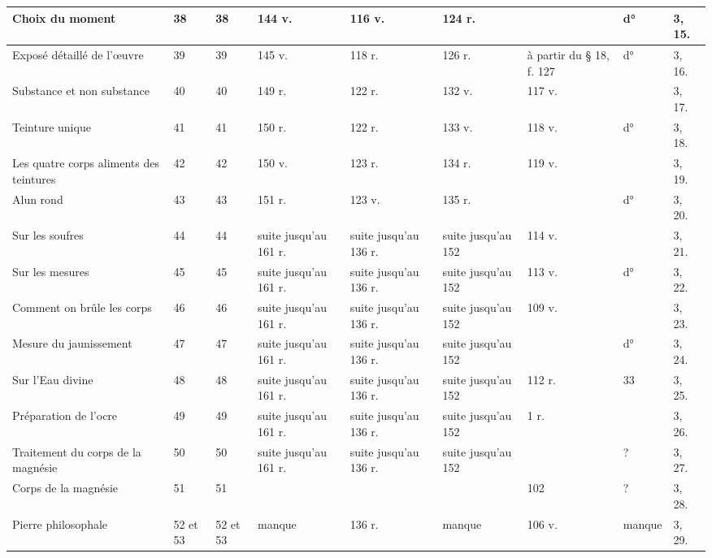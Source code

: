 \documentclass[a4paper, 11pt, oneside, polutonikogreek, french]{article}
\begin{document}
\begin{landscape}
\begin{table}[H]
\begin{tabular}{|p{20mm}|l|l|l|l|l|l|l|p{20mm}|}
        Choix du moment & 38 & 38 & 144 v. & 116 v. & 124 r. & ~ & d° & 3, 15. \\ \hline
        Exposé détaillé de l'œuvre & 39 & 39 & 145 v. & 118 r. & 126 r. & à partir du § 18, f. 127 & d° & 3, 16. \\ \hline
        Substance et non substance & 40 & 40 & 149 r. & 122 r. & 132 v. & 117 v. & ~ & 3, 17. \\ \hline
        Teinture unique & 41 & 41 & 150 r. & 122 r. & 133 v. & 118 v. & d° & 3, 18. \\ \hline
        Les quatre corps aliments des teintures & 42 & 42 & 150 v. & 123 r. & 134 r. & 119 v. & ~ & 3, 19. \\ \hline
        Alun rond & 43 & 43 & 151 r. & 123 v. & 135 r. & ~ & d° & 3, 20. \\ \hline
        Sur les soufres & 44 & 44 & suite jusqu'au 161 r. & suite jusqu'au 136 r. & suite jusqu'au 152 & 114 v. & ~ & 3, 21. \\ \hline
        Sur les mesures & 45 & 45 & suite jusqu'au 161 r. & suite jusqu'au 136 r. & suite jusqu'au 152 & 113 v. & d° & 3, 22. \\ \hline
        Comment on brûle les corps & 46 & 46 & suite jusqu'au 161 r. & suite jusqu'au 136 r. & suite jusqu'au 152 & 109 v. & ~ & 3, 23. \\ \hline
        Mesure du jaunissement & 47 & 47 & suite jusqu'au 161 r. & suite jusqu'au 136 r. & suite jusqu'au 152 & ~ & d° & 3, 24. \\ \hline
        Sur l'Eau divine & 48 & 48 & suite jusqu'au 161 r. & suite jusqu'au 136 r. & suite jusqu'au 152 & 112 r. & 33 & 3, 25. \\ \hline
        Préparation de l'ocre & 49 & 49 & suite jusqu'au 161 r. & suite jusqu'au 136 r. & suite jusqu'au 152 & 1 r. & ~ & 3, 26. \\ \hline
        Traitement du corps de la magnésie & 50 & 50 & suite jusqu'au 161 r. & suite jusqu'au 136 r. & suite jusqu'au 152 & ~ & ? & 3, 27. \\ \hline
        Corps de la magnésie & 51 & 51 & ~ & ~ & ~ & 102 & ? & 3, 28. \\ \hline
        Pierre philosophale & 52 et 53 & 52 et 53 & manque & 136 r. & manque & 106 v. & manque & 3, 29. \\ \hline
    \end{tabular}
\end{table}
\end{landscape}
\clearpage
\end{document}
